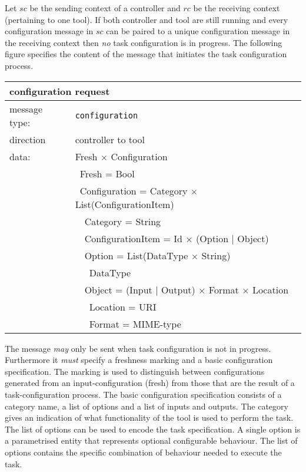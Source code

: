 \documentclass{article}
\newcommand{\msg}[1]{\texttt{#1}}
\begin{document}
   Let $sc$ be the sending context of a controller and $rc$ be the receiving
   context (pertaining to one tool). If both controller and tool are still
   running and every configuration message in $sc$ can be paired to a unique
   configuration message in the receiving context then \emph{no} task
   configuration is in progress. The following figure specifies the content of
   the message that initiates the task configuration process.
   \begin{table}[H]
    \begin{center}
     \begin{tabular}{|ll|}
      \hline
       \multicolumn{2}{|l|}{\textbf{configuration request}} \\
      \hline
       message type:   & \msg{configuration} \\
      \hline
       direction       & controller to tool \\
       data:           & Fresh $\times$ Configuration \\
                       & \ Fresh = Bool \\
                       & \ Configuration = Category $\times$ List(ConfigurationItem) \\
                       & \ \ Category = String \\
                       & \ \ ConfigurationItem = Id $\times$ (Option $|$ Object) \\
                       & \ \ Option = List(DataType $\times$ String) \\
                       & \ \ \ DataType \\
                       & \ \ Object = (Input $|$ Output) $\times$ Format $\times$ Location \\
                       & \ \ \ Location = URI \\
                       & \ \ \ Format   = MIME-type \\
      \hline
     \end{tabular}
     \vspace{-0.3cm}
    \end{center}
   \end{table}

   \noindent The message \emph{may} only be sent when task configuration is not
   in progress.  Furthermore it \emph{must} specify a freshness marking and a
   basic configuration specification.  The marking is used to distinguish
   between configurations generated from an input-configuration (fresh) from
   those that are the result of a task-configuration process.  The basic
   configuration specification consists of a category name, a list of options
   and a list of inputs and outputs. The category gives an indication of what
   functionality of the tool is used to perform the task.  The list of options
   can be used to encode the task specification. A single option is a
   parametrised entity that represents optional configurable behaviour. The
   list of options contains the specific combination of behaviour needed to
   execute the task.
\end{document}
